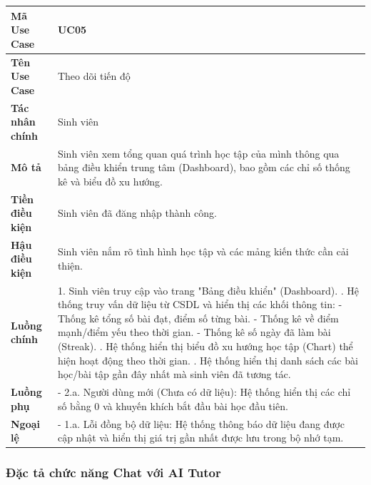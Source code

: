 \documentclass[../main.tex]{subfiles}
\begin{document}
{
\renewcommand{\arraystretch}{1.5}
\begin{tabularx}{\textwidth}{|p{3.5cm}|X|}
\caption{Bảng đặc tả chức năng Theo dõi tiến độ}
\label{tab:bang-dac-ta-chuc-nang-theo-doi-tien-do}
\\
\hline
\textbf{Mã Use Case} & UC05 \\
\hline
\textbf{Tên Use Case} & Theo dõi tiến độ \\
\hline
\textbf{Tác nhân chính} & Sinh viên \\
\hline
\textbf{Mô tả} & Sinh viên xem tổng quan quá trình học tập của mình thông qua bảng điều khiển trung tâm (Dashboard), bao gồm các chỉ số thống kê và biểu đồ xu hướng. \\
\hline
\textbf{Tiền điều kiện} & Sinh viên đã đăng nhập thành công. \\
\hline
\textbf{Hậu điều kiện} & Sinh viên nắm rõ tình hình học tập và các mảng kiến thức cần cải thiện. \\
\hline
\textbf{Luồng chính} & 1. Sinh viên truy cập vào trang "Bảng điều khiển" (Dashboard). \newline 2. Hệ thống truy vấn dữ liệu từ CSDL và hiển thị các khối thông tin: \newline - Thống kê tổng số bài đạt, điểm số từng bài. \newline - Thống kê về điểm mạnh/điểm yếu theo thời gian. \newline - Thống kê số ngày đã làm bài (Streak). \newline 3. Hệ thống hiển thị biểu đồ xu hướng học tập (Chart) thể hiện hoạt động theo thời gian. \newline 4. Hệ thống hiển thị danh sách các bài học/bài tập gần đây nhất mà sinh viên đã tương tác. \\
\hline
\textbf{Luồng phụ} & - 2.a. Người dùng mới (Chưa có dữ liệu): Hệ thống hiển thị các chỉ số bằng 0 và khuyến khích bắt đầu bài học đầu tiên. \\
\hline
\textbf{Ngoại lệ} & - 1.a. Lỗi đồng bộ dữ liệu: Hệ thống thông báo dữ liệu đang được cập nhật và hiển thị giá trị gần nhất được lưu trong bộ nhớ tạm. \\
\hline
\end{tabularx}
}

\subsubsection{Đặc tả chức năng Chat với AI Tutor}
\end{document}
